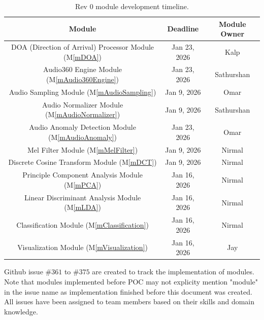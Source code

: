 \documentclass[12pt, titlepage]{article}
\newcommand{\mref}[1]{M\ref{#1}}
\begin{document}
\begin{table}[H]
    \centering
    \begin{tabular}{|c|c|c|}
        \hline
        \textbf{Module} & \textbf{Deadline} & \textbf{Module Owner} \\ \hline
        DOA (Direction of Arrival) Processor Module (\mref{mDOA})
          & Jan 23, 2026 & Kalp \\ 
        Audio360 Engine Module (\mref{mAudio360Engine}) & Jan 23, 2026
          & Sathurshan \\
        Audio Sampling Module (\mref{mAudioSampling}) & Jan 9, 2026
          & Omar \\
        Audio Normalizer Module (\mref{mAudioNormalizer}) & Jan 9, 2026
          & Sathurshan \\
        Audio Anomaly Detection Module (\mref{mAudioAnomaly}) & Jan 23, 2026
          & Omar \\
        Mel Filter Module (\mref{mMelFilter}) & Jan 9, 2026
          & Nirmal \\
        Discrete Cosine Transform Module (\mref{mDCT}) & Jan 9, 2026 
          & Nirmal \\
        Principle Component Analysis Module (\mref{mPCA}) & Jan 16, 2026
          & Nirmal \\
        Linear Discriminant Analysis Module (\mref{mLDA}) & Jan 16, 2026
          & Nirmal \\
        Classification Module (\mref{mClassification}) & Jan 16, 2026
          & Nirmal \\
        Visualization Module (\mref{mVisualization}) & Jan 16, 2026
          & Jay \\
        \hline
    \end{tabular}
    \caption{Rev 0 module development timeline.}
    \label{table:rev0_timeline}
\end{table}

Github issue $\#361$ to $\#375$ are created to track the implementation of 
modules. Note that modules implemented before POC may not explicity mention
"module" in the issue name as implementation finished before this document was
created. All issues have been assigned to team members based on their skills and
domain knowledge.
\end{document}
